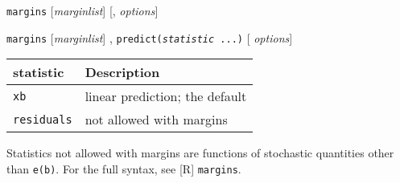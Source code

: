 \vskip 0.5cm

{\tt margins} [{\it marginlist}] [, {\it options}]

\vskip 0.5cm

{\tt margins} [{\it marginlist}] , {\tt predict({\it statistic} ...)} [{\it
options}]

\vskip 0.5cm

\begin{tabular}{ll}
\hline
statistic&          Description \\
\hline
{\tt xb}       & linear prediction; the default \\
{\tt residuals}& not allowed with margins \\
\hline
\end{tabular}

\vskip 0.5cm
\noindent
Statistics not allowed with margins are functions of stochastic quantities other
than {\tt e(b)}.  For the full syntax, see [R] {\tt margins}.
